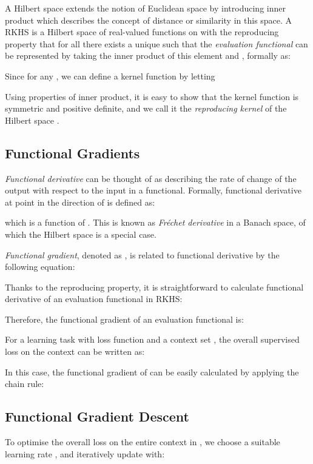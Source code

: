 \documentclass{article}
\theoremstyle{definition}
\begin{document}
A Hilbert space  extends the notion of Euclidean space by introducing inner product  which describes the concept of distance or similarity in this space. A \gls{RKHS}  is a Hilbert space of real-valued functions on  with the reproducing property that for all  there exists a unique  such that the \emph{evaluation functional}  can be represented by taking the inner product of this element  and , formally as:


Since  for any , we can define a kernel function  by letting

Using properties of inner product, it is easy to show that the kernel function  is symmetric and positive definite, and we call it the \emph{reproducing kernel} of the Hilbert space .


\subsection{Functional Gradients} \label{sub:fg}

\emph{Functional derivative} can be thought of as describing the rate of change of the output with respect to the input in a functional. Formally, functional derivative at point  in the direction of  is defined as:

which is a function of . This is known as \emph{Fréchet derivative} in a Banach space, of which the Hilbert space is a special case.

\emph{Functional gradient}, denoted as , is related to functional derivative by the following equation:


Thanks to the reproducing property, it is straightforward to calculate functional derivative of an evaluation functional in \gls{RKHS}:

Therefore, the functional gradient of an evaluation functional is:


For a learning task with loss function  and a context set , the overall supervised loss on the context can be written as:

In this case, the functional gradient of  can be easily calculated by applying the chain rule:


\subsection{Functional Gradient Descent} \label{sub:fgd-appendix}


To optimise the overall loss on the entire context in , we choose a suitable learning rate , and iteratively update  with:
\end{document}
